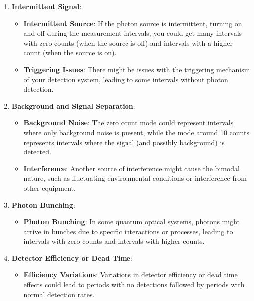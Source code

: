\begin{enumerate}
\def\labelenumi{\arabic{enumi}.}
\tightlist
\item
  \textbf{Intermittent Signal}:

  \begin{itemize}
  \tightlist
  \item
    \textbf{Intermittent Source}: If the photon source is intermittent,
    turning on and off during the measurement intervals, you could get
    many intervals with zero counts (when the source is off) and
    intervals with a higher count (when the source is on).
  \item
    \textbf{Triggering Issues}: There might be issues with the
    triggering mechanism of your detection system, leading to some
    intervals without photon detection.
  \end{itemize}
\item
  \textbf{Background and Signal Separation}:

  \begin{itemize}
  \tightlist
  \item
    \textbf{Background Noise}: The zero count mode could represent
    intervals where only background noise is present, while the mode
    around 10 counts represents intervals where the signal (and possibly
    background) is detected.
  \item
    \textbf{Interference}: Another source of interference might cause
    the bimodal nature, such as fluctuating environmental conditions or
    interference from other equipment.
  \end{itemize}
\item
  \textbf{Photon Bunching}:

  \begin{itemize}
  \tightlist
  \item
    \textbf{Photon Bunching}: In some quantum optical systems, photons
    might arrive in bunches due to specific interactions or processes,
    leading to intervals with zero counts and intervals with higher
    counts.
  \end{itemize}
\item
  \textbf{Detector Efficiency or Dead Time}:

  \begin{itemize}
  \tightlist
  \item
    \textbf{Efficiency Variations}: Variations in detector efficiency or
    dead time effects could lead to periods with no detections followed
    by periods with normal detection rates.
  \end{itemize}
\end{enumerate}

